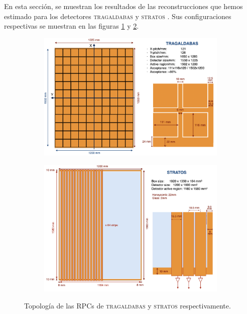 \documentclass[a4paper]{article}
\begin{document}
En esta sección, se muestran los resultados de las reconstrucciones que hemos estimado para los detectores \textsc{tragaldabas} y \textsc{stratos} . Sus configuraciones respectivas se muestran en las figuras \ref{fg:tragas_rpc} y \ref{fg:stratos_rpc}.

\begin{figure}[H]  %
  \begin{subfigure}[b]{0.5\linewidth}
    \centering
    \includegraphics[width=\linewidth]{tragas_pitch.png} 
    \caption{} 
    \label{fg:tragas_rpc} 
  \end{subfigure}%
  \begin{subfigure}[b]{0.5\linewidth}
    \centering
    \includegraphics[width=\linewidth]{stratos_pitch.png} 
    \caption{} 
    \label{fg:stratos_rpc} 
  \end{subfigure} 
  \caption{Topología de las RPCs de \textsc{tragaldabas} y \textsc{stratos} respectivamente.}
  \label{fg:tragastratos} 
\end{figure}
\end{document}
